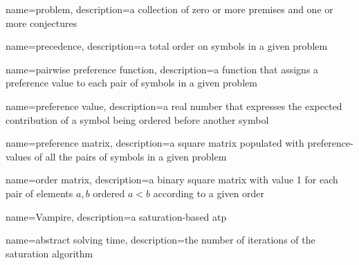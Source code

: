 \usepackage{glossaries}


{
	name=problem,
	description={a collection of zero or more premises and one or more conjectures}
}

{
	name=precedence,
	description={a total order on symbols in a given \gls{problem}}
}

{
	name=pairwise preference function,
	description={a function that assigns a preference value to each pair of symbols in a given problem}
}

{
	name=preference value,
	description={a real number that expresses the expected contribution of a symbol being ordered before another symbol}
}

{
	name=preference matrix,
	description={a square matrix populated with \glspl{preference-value} of all the pairs of symbols in a given \gls{problem}}
}

{
	name=order matrix,
	description={a binary square matrix with value 1 for each pair of elements \(a, b\) ordered \(a < b\) according to a given order}
}

{
	name=Vampire,
	description={a saturation-based \gls{atp} \cite{Kovacs2013}}
}

{
	name=abstract solving time,
	description={the number of iterations of the saturation algorithm}
}
